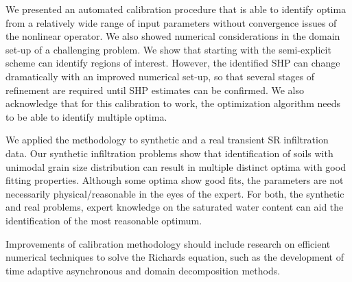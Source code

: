 \documentclass[review,times,3p,twocolumn,10pt]{elsarticle}
\begin{document}
We presented an automated calibration procedure that is able to identify optima from a relatively wide range of input parameters without convergence issues of the nonlinear operator. We also showed numerical considerations in the domain set-up of a challenging problem. We show that starting with the semi-explicit scheme can identify regions of interest. However, the identified SHP can change dramatically with an improved numerical set-up, so that several stages of refinement are required until SHP estimates can be confirmed. We also acknowledge that for this calibration to work, the optimization algorithm needs to be able to identify multiple optima. 

We applied the methodology to synthetic and a real transient SR infiltration data. Our synthetic infiltration problems show that identification of soils with unimodal grain size distribution can result in multiple distinct optima with good fitting properties. Although some optima show good fits, the parameters are not necessarily physical/reasonable in the eyes of the expert. For both, the synthetic and real problems, expert knowledge on the saturated water content can aid the identification of the most reasonable optimum. 

Improvements of calibration methodology should include research on efficient numerical techniques to solve the Richards equation, such as the development of time adaptive asynchronous and domain decomposition methods.


\end{document}
